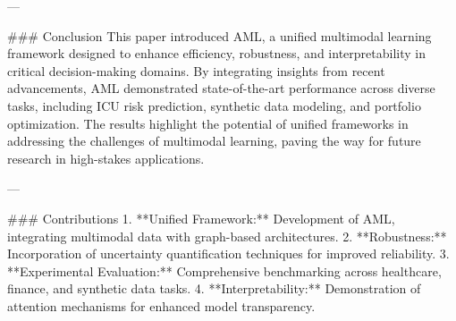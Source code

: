 ---

### Conclusion  
This paper introduced AML, a unified multimodal learning framework designed to enhance efficiency, robustness, and interpretability in critical decision-making domains. By integrating insights from recent advancements, AML demonstrated state-of-the-art performance across diverse tasks, including ICU risk prediction, synthetic data modeling, and portfolio optimization. The results highlight the potential of unified frameworks in addressing the challenges of multimodal learning, paving the way for future research in high-stakes applications.

---

### Contributions  
1. **Unified Framework:** Development of AML, integrating multimodal data with graph-based architectures.  
2. **Robustness:** Incorporation of uncertainty quantification techniques for improved reliability.  
3. **Experimental Evaluation:** Comprehensive benchmarking across healthcare, finance, and synthetic data tasks.  
4. **Interpretability:** Demonstration of attention mechanisms for enhanced model transparency.